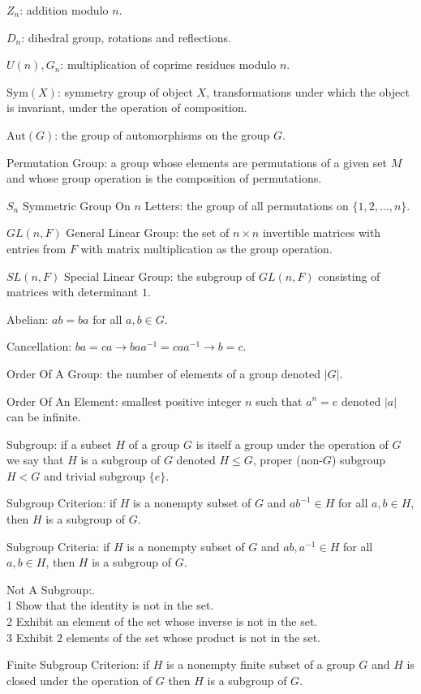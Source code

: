 $Z_n$: addition modulo $n$.

$D_{n}$: dihedral group, rotations and reflections.

$U(n), G_n$: multiplication of coprime residues modulo $n$.

$\text{Sym}(X)$: symmetry group of object $X$, transformations under which the object is invariant, under the operation of composition.

$\text{Aut}(G)$: the group of automorphisms on the group $G$.

Permutation Group: a group whose elements are permutations of a given set $M$ and whose group operation is the composition of permutations.

$S_n$ Symmetric Group On $n$ Letters: the group of all permutations on $\{ 1,2,\dots,n \}$.

$GL(n,F)$ General Linear Group: the set of $n \times n$ invertible matrices with entries from $F$ with matrix multiplication as the group operation.

$SL(n,F)$ Special Linear Group: the subgroup of $GL(n,F)$ consisting of matrices with determinant $1$.

Abelian: $ab=ba$ for all $a,b \in G$.

Cancellation: $ba=ca \to baa^{-1}=caa^{-1} \to b=c$.

Order Of A Group: the number of elements of a group denoted $|G|$.

Order Of An Element: smallest positive integer $n$ such that $a^n=e$ denoted $|a|$ can be infinite.

Subgroup: if a subset $H$ of a group $G$ is itself a group under the operation of $G$ we say that $H$ is a subgroup of $G$ denoted $H \le G$, proper (non-$G$) subgroup $H < G$ and trivial subgroup $\{e \}$.

Subgroup Criterion: if $H$ is a nonempty subset of $G$ and $ab^{-1} \in H$ for all $a,b \in H$, then $H$ is a subgroup of $G$.

Subgroup Criteria: if $H$ is a nonempty subset of $G$ and $ab,a^{-1} \in H$ for all $a,b \in H$, then $H$ is a subgroup of $G$.

Not A Subgroup:. \\
1 Show that the identity is not in the set. \\
2 Exhibit an element of the set whose inverse is not in the set. \\
3 Exhibit $2$ elements of the set whose product is not in the set.

Finite Subgroup Criterion: if $H$ is a nonempty finite subset of a group $G$ and $H$ is closed under the operation of $G$ then $H$ is a subgroup of $G$.

